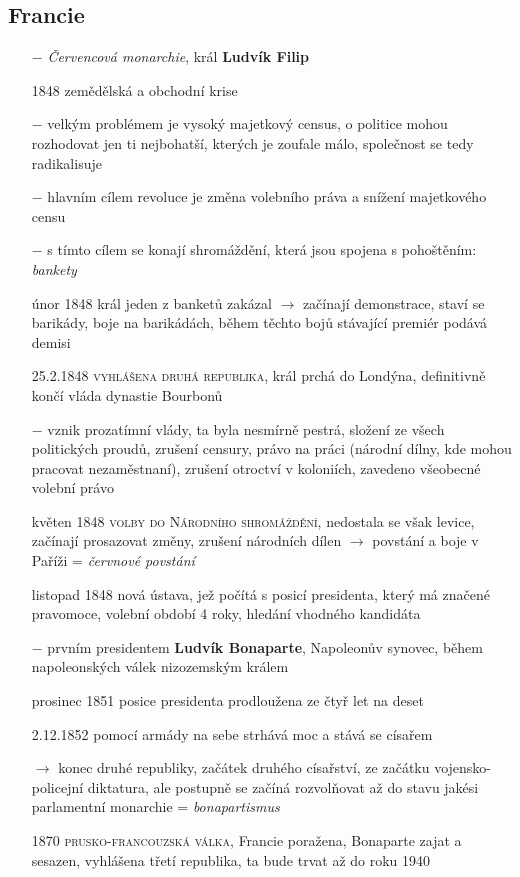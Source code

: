 \documentclass{article}
\begin{document}
\subsection*{Francie}
\begin{itemize}
    \vspace{-0.5em}
    \setlength\itemsep{0.15em}
    \item[$-$] \textit{Červencová monarchie}, král \textbf{Ludvík Filip}
    \item[1848] zemědělská a obchodní krise
    \item[$-$] velkým problémem je vysoký majetkový census, o politice mohou rozhodovat jen ti nejbohatší, kterých je zoufale málo, společnost se tedy radikalisuje
    \item[$-$] hlavním cílem revoluce je změna volebního práva a snížení majetkového censu
    \item[$-$] s tímto cílem se konají shromáždění, která jsou spojena s pohoštěním: \textit{bankety}
    \item[únor 1848] král jeden z banketů zakázal $\rightarrow$ začínají demonstrace, staví se barikády, boje na barikádách, během těchto bojů stávající premiér podává demisi
    \item[25.2.1848] \textsc{vyhlášena druhá republika}, král prchá do Londýna, definitivně končí vláda dynastie Bourbonů
    \item[$-$] vznik prozatímní vlády, ta byla nesmírně pestrá, složení ze všech politických proudů, zrušení censury, právo na práci (národní dílny, kde mohou pracovat nezaměstnaní), zrušení otroctví v koloniích, zavedeno všeobecné volební právo
    \item[květen 1848] \textsc{volby do Národního shromáždění}, nedostala se však levice, začínají prosazovat změny, zrušení národních dílen $\rightarrow$ povstání a boje v Paříži = \textit{červnové povstání}
    \item[listopad 1848] nová ústava, jež počítá s posicí presidenta, který má značené pravomoce, volební období 4 roky, hledání vhodného kandidáta
    \item[$-$] prvním presidentem \textbf{Ludvík Bonaparte}, Napoleonův synovec, během napoleonských válek nizozemským králem
    \item[prosinec 1851] posice presidenta prodloužena ze čtyř let na deset
    \item[2.12.1852] pomocí armády na sebe strhává moc a stává se císařem
    \item[$\rightarrow$] konec druhé republiky, začátek druhého císařství, ze začátku vojensko-policejní diktatura, ale postupně se začíná rozvolňovat až do stavu jakési parlamentní monarchie = \textit{bonapartismus}
    \item[1870] \textsc{prusko-francouzská válka}, Francie poražena, Bonaparte zajat a sesazen, vyhlášena třetí republika, ta bude trvat až do roku 1940
\end{itemize}
\end{document}
